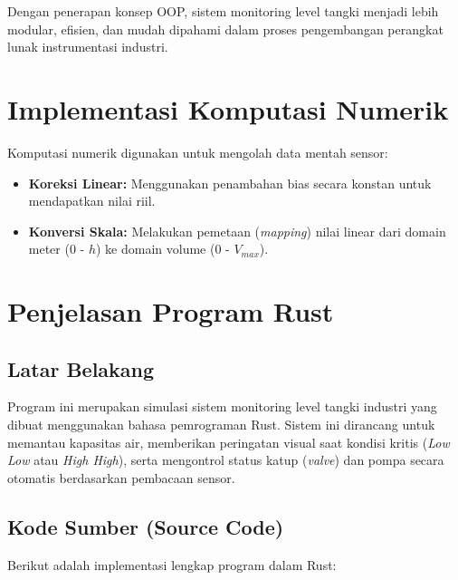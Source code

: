 \documentclass[12pt,a4paper]{article}
\begin{document}
Dengan penerapan konsep OOP, sistem monitoring level tangki menjadi lebih modular, efisien, dan mudah dipahami dalam proses pengembangan perangkat lunak instrumentasi industri.

\section{Implementasi Komputasi Numerik}
Komputasi numerik digunakan untuk mengolah data mentah sensor:
\begin{itemize}
    \item \textbf{Koreksi Linear:} Menggunakan penambahan bias secara konstan untuk mendapatkan nilai riil.
    \item \textbf{Konversi Skala:} Melakukan pemetaan (\textit{mapping}) nilai linear dari domain meter (0 - $h$) ke domain volume (0 - $V_{max}$).
\end{itemize}

\newpage
\section{Penjelasan Program Rust}

\subsection{Latar Belakang}
Program ini merupakan simulasi sistem monitoring level tangki industri yang dibuat menggunakan bahasa pemrograman Rust. Sistem ini dirancang untuk memantau kapasitas air, memberikan peringatan visual saat kondisi kritis (\textit{Low Low} atau \textit{High High}), serta mengontrol status katup (\textit{valve}) dan pompa secara otomatis berdasarkan pembacaan sensor.

\subsection{Kode Sumber (Source Code)}
Berikut adalah implementasi lengkap program dalam Rust:
\end{document}
